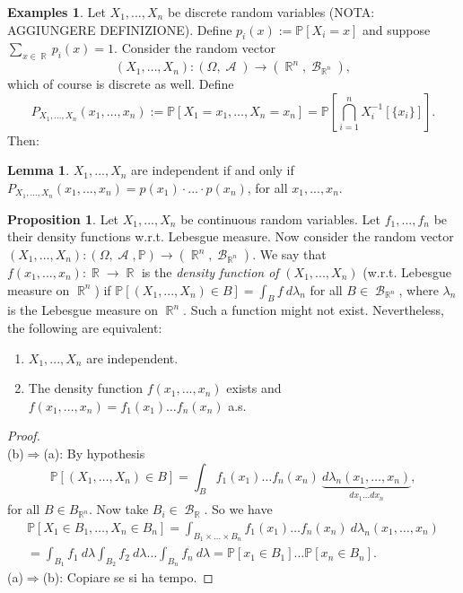 \documentclass[12pt,a4paper]{report}
\theoremstyle{definition}
\newtheorem{lemma}[theorem]{Lemma}
\newtheorem{proposition}[theorem]{Proposition}
\newtheorem*{examples}{Examples}
\theoremstyle{num.custom-title}
\DeclareMathOperator{\A}{\mathcal{A}}
\DeclareMathOperator{\B}{\mathcal{B}}
\DeclareMathOperator{\R}{\mathbb{R}}
\DeclareMathOperator{\imp}{\Rightarrow}
\renewcommand{\1}{\mathbbm{1}}
\renewcommand{\P}{\mathbb{P}}
\begin{document}
\begin{examples}
Let $X_1,...,X_n$ be discrete random variables (NOTA: AGGIUNGERE DEFINIZIONE). Define $p_i(x) := \P[X_i=x]$ and suppose $\sum_{x \in \R} p_i(x) = 1$. Consider the random vector
\[
(X_1,\ldots,X_n) : (\Omega,\A) \to (\R^n,\B_{\R^n}),
\]
which of course is discrete as well. Define
\[
P_{X_1,\ldots,X_n}(x_1,\ldots,x_n) := \P[X_1=x_1,\ldots,X_n=x_n] = \P \left[ \bigcap_{i=1}^n X_i^{-1}[\{x_i\}] \right].
\]
Then:
\begin{lemma}
$X_1,...,X_n$ are independent if and only if $P_{X_1,...,X_n}(x_1,...,x_n)=p(x_1) \cdot ... \cdot p(x_n)$, for all $x_1,...,x_n$.
\end{lemma}
\end{examples}
\begin{proposition}
Let $X_1,...,X_n$ be continuous random variables. Let $f_1,...,f_n$ be their density functions w.r.t. Lebesgue measure. Now consider the random vector $(X_1,...,X_n) \colon (\Omega,\A,\P) \to (\R^n, \B_{\R^n})$. We say that $f(x_1,...,x_n) \colon \R \to \R$ is the \emph{density function of} $(X_1,...,X_n)$ (w.r.t. Lebesgue measure on $\R^n$) if $\P[(X_1,...,X_n) \in B] = \int_B f \ d\lambda_n$ for all $B \in \B_{\R^n}$, where $\lambda_n$ is the Lebesgue measure on $\R^n$. Such a function might not exist. Nevertheless, the following are equivalent:
\begin{enumerate}
\item $X_1,...,X_n$ are independent.
\item The density function $f(x_1,...,x_n)$ exists and $f(x_1,...,x_n)=f_1(x_1) \ldots f_n(x_n)$ a.s.
\end{enumerate}
\begin{proof}\ \\
(b)$\imp$(a): By hypothesis
\[
\P[(X_1,\ldots,X_n) \in B] = \int_B f_1(x_1) \ldots f_n(x_n) \ \underbrace{d\lambda_n(x_1,\ldots,x_n)}_{dx_1 \ldots dx_n},
\]
for all $B \in B_{\R^n}$. Now take $B_i \in \B_{\R}$. So we have
\begin{multline*}
\P[X_1 \in B_1, \ldots, X_n \in B_n] = \int_{B_1 \times \ldots \times B_n} f_1(x_1) \ldots f_n(x_n) \ d\lambda_n(x_1,\ldots,x_n) \\ 
= \int_{B_1} f_1 \ d\lambda \int_{B_2} f_2 \ d\lambda \ldots \int_{B_n} f_n \ d\lambda = \P[x_1 \in B_1] \ldots \P[x_n \in B_n].
\end{multline*}
(a)$\imp$(b): Copiare se si ha tempo.
\end{proof}
\end{proposition}
\end{document}

